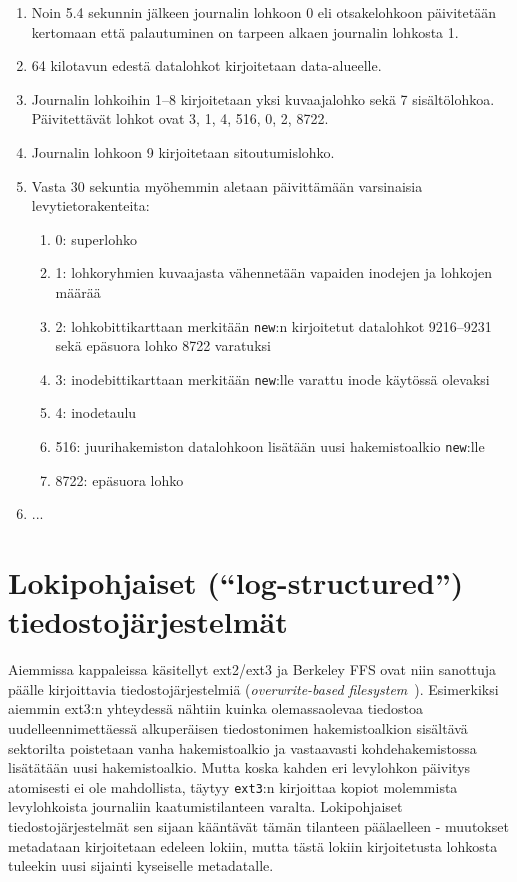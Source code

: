 \begin{enumerate}
    \item{Noin 5.4 sekunnin jälkeen journalin lohkoon 0 eli otsakelohkoon päivitetään kertomaan että palautuminen on tarpeen alkaen journalin lohkosta 1.}
    \item{64 kilotavun edestä datalohkot kirjoitetaan data-alueelle.}
    \item{Journalin lohkoihin 1--8 kirjoitetaan yksi kuvaajalohko sekä 7 sisältölohkoa. Päivitettävät lohkot ovat 3, 1, 4, 516, 0, 2, 8722.}
    \item{Journalin lohkoon 9 kirjoitetaan sitoutumislohko.}
    \item{Vasta 30 sekuntia myöhemmin aletaan päivittämään varsinaisia levytietorakenteita:}
    \begin{enumerate}
        \item{0: superlohko}
        \item{1: lohkoryhmien kuvaajasta vähennetään vapaiden inodejen ja lohkojen määrää}
        \item{2: lohkobittikarttaan merkitään \texttt{new}:n kirjoitetut datalohkot 9216--9231 sekä epäsuora lohko 8722 varatuksi}
        \item{3: inodebittikarttaan merkitään \texttt{new}:lle varattu inode käytössä olevaksi}
        \item{4: inodetaulu}
        \item{516: juurihakemiston datalohkoon lisätään uusi hakemistoalkio \texttt{new}:lle}
        \item{8722: epäsuora lohko}
    \end{enumerate}
    \item{...}
\end{enumerate}

\section{Lokipohjaiset (``log-structured'') tiedostojärjestelmät}
\label{ChapLogStructured}
Aiemmissa kappaleissa käsitellyt ext2/ext3 ja Berkeley FFS ovat niin sanottuja päälle kirjoittavia tiedostojärjestelmiä (\emph{overwrite-based filesystem}~\cite{Btrfs}).
Esimerkiksi aiemmin ext3:n yhteydessä nähtiin kuinka olemassaolevaa tiedostoa uudelleennimettäessä
alkuperäisen tiedostonimen hakemistoalkion sisältävä sektorilta poistetaan vanha hakemistoalkio
ja vastaavasti kohdehakemistossa lisätätään uusi hakemistoalkio.
Mutta koska kahden eri levylohkon päivitys atomisesti ei ole mahdollista,
täytyy \texttt{ext3}:n kirjoittaa kopiot molemmista levylohkoista journaliin kaatumistilanteen varalta.
Lokipohjaiset tiedostojärjestelmät sen sijaan kääntävät tämän tilanteen päälaelleen - muutokset metadataan kirjoitetaan edeleen lokiin,
mutta tästä lokiin kirjoitetusta lohkosta tuleekin uusi sijainti kyseiselle metadatalle.

